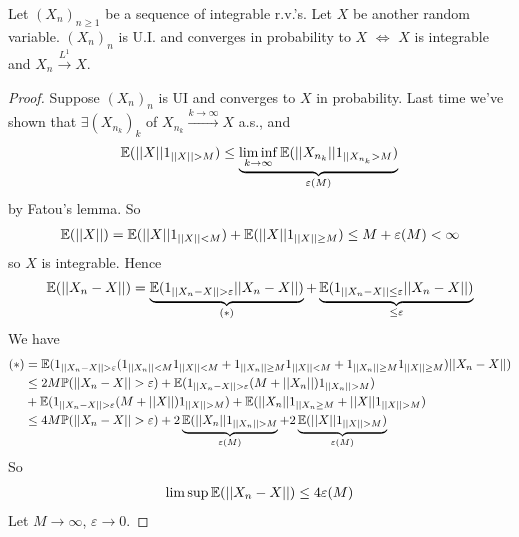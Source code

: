\documentclass[a4paper]{article}
\begin{document}
\begin{thm}
Let $(X_n)_{n \geq 1}$ be a sequence of integrable r.v.'s. Let $X$ be another random variable. $(X_n)_n$ is U.I. and converges in probability to $X$ $\iff$ $X$ is integrable and $X_n \xrightarrow{L^1} X$.
\begin{proof}
Suppose $(X_n)_n$ is UI and converges to $X$ in probability. Last time we've shown that $\exists (X_{n_k})_k$ of $X_{n_k} \xrightarrow{k \to \infty} X$ a.s., and
\begin{equation*}
\begin{aligned}
\mathbb{E}(||X|| 1_{||X|| > M}) \leq \underbrace{\liminf_{k \to \infty} \mathbb{E}(||X_{n_k}|| 1_{||X_{n_k} > M})}_{\varepsilon(M)}
\end{aligned}
\end{equation*}
by Fatou's lemma. So
\begin{equation*}
\begin{aligned}
\mathbb{E}(||X||) = \mathbb{E}(||X|| 1_{||X||<M}) + \mathbb{E}(||X|| 1_{||X||\geq M}) \leq M+\varepsilon(M) < \infty
\end{aligned}
\end{equation*}
so $X$ is integrable. Hence
\begin{equation*}
\begin{aligned}
\E(||X_n-X||) &= \underbrace{\E(1_{||X_n-X||>\varepsilon} ||X_n - X||)}_{(*)} + \underbrace{\E(1_{||X_n-X||\leq \varepsilon} ||X_n-X||)}_{\leq \varepsilon}\\
\end{aligned}
\end{equation*}
We have
\begin{equation*}
\begin{aligned}
(*) &= \E(1_{||X_n-X|| > \varepsilon} (1_{||X_n||<M} 1_{||X|| < M} + 1_{||X_n|| \geq M} 1_{||X|| < M} + 1_{||X_n|| \geq M} 1_{||X||\geq M})||X_n-X||)\\
&\leq 2M \P(||X_n-X|| > \varepsilon) + \E(1_{||X_n-X||>\varepsilon}(M+||X_n||)1_{||X_n||>M}) \\
&+ \E(1_{||X_n-X||>\varepsilon} (M+||X|| ) 1_{||X||>M}) + \E(||X_n||1_{||X_n \geq M} + ||X|| 1_{||X|| > M})\\
&\leq 4M \P(||X_n-X|| > \varepsilon) + 2 \underbrace{\E(||X_n|| 1_{||X_n|| > M}}_{\varepsilon(M)} + 2\underbrace{\E(||X|| 1_{||X|| > M})} _{\varepsilon(M)}
\end{aligned}
\end{equation*}
So
\begin{equation*}
\begin{aligned}
\limsup \mathbb{E}(||X_n-X||) \leq 4\varepsilon(M)
\end{aligned}
\end{equation*}
Let $M \to \infty$, $\varepsilon \to 0$.
\end{proof}
\end{thm}
\end{document}
